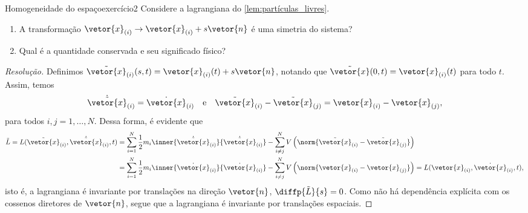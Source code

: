 \begin{exercício}{Homogeneidade do espaço}{exercício2}
    Considere a lagrangiana do \cref{lem:partículas_livres}.
    \begin{enumerate}[label=(\alph*)]
        \item A transformação \(\vetor{x}_{(i)} \to \vetor{x}_{(i)} + s\vetor{n}\) é uma simetria do sistema?
        \item Qual é a quantidade conservada e seu significado físico?
    \end{enumerate}
\end{exercício}
\begin{proof}[Resolução]
    Definimos \(\tilde{\vetor{x}}_{(i)}(s,t) = \vetor{x}_{(i)}(t) + s\vetor{n}\), notando que \(\tilde{\vetor{x}}(0,t) = \vetor{x}_{(i)}(t)\) para todo \(t\). Assim, temos
    \begin{equation*}
        \dot{\tilde{\vetor{x}}}_{(i)} = \dot{\vetor{x}}_{(i)}\quad\text{e}\quad\tilde{\vetor{x}}_{(i)} - \tilde{\vetor{x}}_{(j)} = \vetor{x}_{(i)} - \vetor{x}_{(j)},
    \end{equation*}
    para todos \(i, j = 1, \dots, N.\) Dessa forma, é evidente que
    \begin{align*}
        \tilde{L} = L(\tilde{\vetor{x}}_{(i)}, \dot{\tilde{\vetor{x}}}_{(i)}, t) &= \sum_{i = 1}^N \frac12 m_i \inner{\dot{\tilde{\vetor{x}}}_{(i)}}{\dot{\tilde{\vetor{x}}}_{(i)}} - \sum_{i\neq j}^{N} V\left(\norm{\tilde{\vetor{x}}_{(i)} - \tilde{\vetor{x}}_{(j)}}\right)\\
                                                                                 &= \sum_{i = 1}^N \frac12 m_i \inner{\dot{{\vetor{x}}}_{(i)}}{\dot{{\vetor{x}}}_{(i)}} - \sum_{i\neq j}^{N} V\left(\norm{{\vetor{x}}_{(i)} - {\vetor{x}}_{(j)}}\right) = L(\vetor{x}_{(i)}, \dot{\vetor{x}}_{(i)}, t),
    \end{align*}
    isto é, a lagrangiana é invariante por translações na direção \(\vetor{n}\), \(\diffp{\tilde{L}}{s} = 0\). Como não há dependência explícita com os cossenos diretores de \(\vetor{n}\), segue que a lagrangiana é invariante por translações espaciais.


\end{proof}
